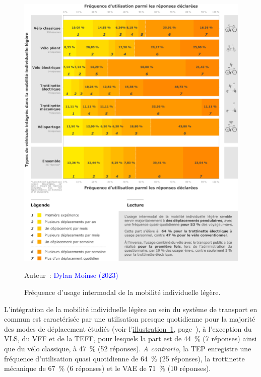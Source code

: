 \begin{refsegment}
    \begin{figure}[h!]\vspace*{4pt}
        \caption{Fréquence d'usage intermodal de la mobilité individuelle légère.}
        \label{fig-chap4:frequence-modes}
        \centerline{\includegraphics[width=1\columnwidth]{src/Figures/Chap-4/FR_Frequence.pdf}}
        \vspace{5pt}
        \begin{flushright}\scriptsize{
        Auteur~: \textcolor{blue}{Dylan Moinse (2023)}
        }\end{flushright}
    \end{figure}

L'intégration de la mobilité individuelle légère au sein du système de transport en commun est caractérisée par une utilisation presque quotidienne pour la majorité des modes de déplacement étudiés (voir l'\hyperref[fig-chap4:frequence-modes]{illustration~\ref{fig-chap4:frequence-modes}}, page~\pageref{fig-chap4:frequence-modes}), à l'exception du \acrshort{VLS}, du \acrshort{VFF} et de la \acrshort{TEFF}, pour lesquels la part est de 44~\% (7 réponses) ainsi que du vélo classique, à 47~\% (52 réponses). \textsl{A contrario}, la \acrshort{TEP} enregistre une fréquence d'utilisation quasi quotidienne de 64~\% (25 réponses), la trottinette mécanique de 67~\% (6 réponses) et le \acrshort{VAE} de 71~\% (10 réponses).%


\end{refsegment}
